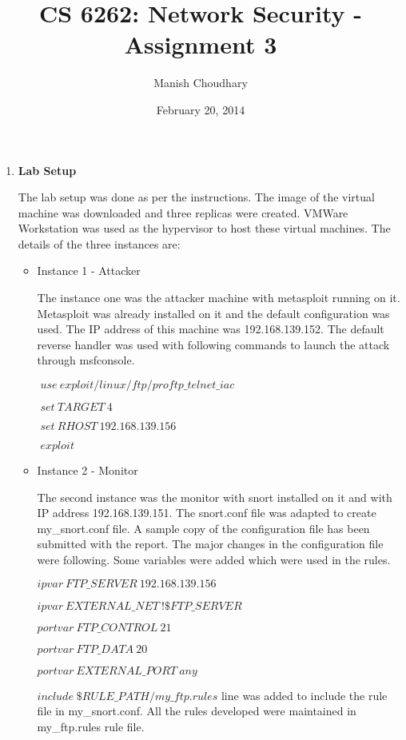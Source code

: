 \documentclass[11pt, pdftex]{article}
\title{CS 6262: Network Security - Assignment 3}
\author{Manish Choudhary}
\date{February 20, 2014}
\begin{document}
\maketitle
\begin{enumerate}
	\item \textbf{Lab Setup}
	
The lab setup was done as per the instructions. The image of the virtual machine was downloaded and three replicas were created. VMWare Workstation was used as the hypervisor to host these virtual machines.  The details of the three instances are: 

\begin{itemize}
	\item Instance 1 - Attacker
		
		The instance one was the attacker machine with metasploit running on it. Metasploit was already installed on it and the default configuration was used. The IP address of this machine was 192.168.139.152. The default reverse handler was used with following commands to launch the attack through msfconsole.
		
		\centerline {$\;use\:exploit/linux/ftp/proftp\_telnet\_iac$}
		
		\centerline {$\;set\: TARGET\: 4$}
		
		\centerline {$\;set\:RHOST\:192.168.139.156$}
		
		\centerline {$\;exploit$}
	
	\item Instance 2 - Monitor 
	
	The second instance was the monitor with snort installed on it and with IP address 192.168.139.151. The snort.conf file was adapted to create my\_snort.conf file. A sample copy of the configuration file has been submitted with the report. The major changes in the configuration file were following. Some variables were added which were used in the rules.
	
		\centerline {$ipvar\:FTP\_SERVER\: 192.168.139.156$}
		  
		  \centerline {$ipvar\: EXTERNAL\_NET\: !\$FTP\_SERVER$}
		  
		  \centerline {$portvar\: FTP\_CONTROL\: 21$}
		  
		  \centerline {$portvar\: FTP\_DATA\: 20$}
		  
		  \centerline {$portvar\: EXTERNAL\_PORT\: any$}

$include \;\$RULE\_PATH/my\_ftp.rules$ line was added to include the rule file in my\_snort.conf. All the rules developed were maintained in my\_ftp.rules rule file.


\end{itemize}
\end{enumerate}
\end{document}
